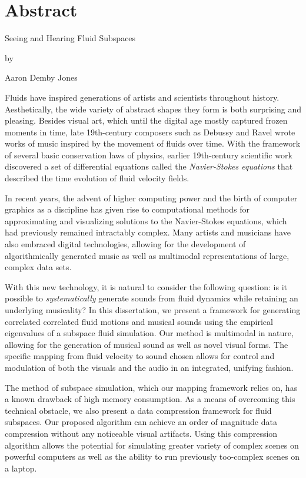 \chapter*{Abstract}
{\centering
Seeing and Hearing Fluid Subspaces \par
\bigskip\bigskip
by \par
\bigskip\bigskip
Aaron Demby Jones \par
\bigskip\bigskip
}
Fluids have inspired generations of artists and scientists throughout history. Aesthetically, the wide variety of abstract shapes they form is both surprising and pleasing. Besides visual art, which until the digital age mostly captured frozen moments in time, late 19th-century composers such as Debussy and Ravel wrote works of music inspired by the movement of fluids over time. With the framework of several basic conservation laws of physics, earlier 19th-century scientific work discovered a set of differential equations called the {\em Navier-Stokes equations} that described the time evolution of fluid velocity fields. 

In recent years, the advent of higher computing power and the birth of computer graphics as a discipline has given rise to computational methods for approximating and visualizing solutions to the Navier-Stokes equations, which had previously remained intractably complex. Many artists and musicians have also embraced digital technologies, allowing for the development of algorithmically generated music as well as multimodal representations of large, complex data sets. 

With this new technology, it is natural to consider the following question: is it possible to {\em systematically} generate sounds from fluid dynamics while retaining an underlying musicality? In this dissertation, we present a framework for generating correlated correlated fluid motions and musical sounds using the empirical eigenvalues of a subspace fluid simulation. Our method is multimodal in nature, allowing for the generation of musical sound as well as novel visual forms. The specific mapping from fluid velocity to sound chosen allows for control and modulation of both the visuals and the audio in an integrated, unifying fashion.

The method of subspace simulation, which our mapping framework relies on, has a known drawback of high memory consumption. As a means of overcoming this technical obstacle, we also present a data compression framework for fluid subspaces. Our proposed algorithm can achieve an order of magnitude data compression without any noticeable visual artifacts. Using this compression algorithm allows the potential for simulating  greater variety of complex scenes on powerful computers as well as the ability to run previously too-complex scenes on a laptop.